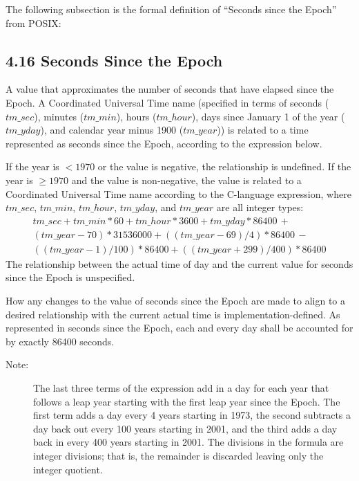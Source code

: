 \documentclass[letterpaper,twoside]{article}
\begin{document}
The following subsection is the formal definition of ``Seconds
since the Epoch'' from POSIX:

\subsection*{4.16 Seconds Since the Epoch}
A value that approximates the number
of seconds that have elapsed
since the Epoch. A Coordinated Universal Time name
(specified in terms of seconds ($tm\_sec$), minutes ($tm\_min$),
hours ($tm\_hour$), days since January 1 of the year ($tm\_yday$),
and calendar year minus 1900 ($tm\_year$)) is related to a time
represented as seconds since the Epoch, according to the expression below.

If the year is $< 1970$ or the value is negative, the relationship is
undefined.
If the year is $\geq 1970$ and the value is non-negative, the value is
related to a Coordinated Universal Time name according to the
C-language expression, where $tm\_sec$, $tm\_min$, $tm\_hour$,
$tm\_yday$, and $tm\_year$ are all integer types:
\begin{multline*}
  tm\_sec + tm\_min*60 + tm\_hour*3600 + tm\_yday*86400 \,+ \\
  (tm\_year-70)*31536000 + ((tm\_year-69)/4)*86400 \,- \\
  ((tm\_year-1)/100)*86400 + ((tm\_year+299)/400)*86400
\end{multline*}
The relationship between the actual time of day and the current value
for seconds since the Epoch is unspecified.

How any changes to the value of seconds since the Epoch are made
to align to a desired relationship with the current actual time
is implementation-defined. As represented in seconds since the Epoch,
each and every day shall be accounted for by exactly \num{86400} seconds.

\begin{description}
\item[Note:]
  The last three terms of the expression add in a day for each year
  that follows a leap year starting with the first leap year since
  the Epoch. The first term adds a day every 4 years starting in 1973,
  the second subtracts a day back out every 100 years starting in 2001,
  and the third adds a day back in every 400 years starting in 2001.
  The divisions in the formula are integer divisions; that is, the
  remainder is discarded leaving only the integer quotient.
\end{description}
\end{document}
